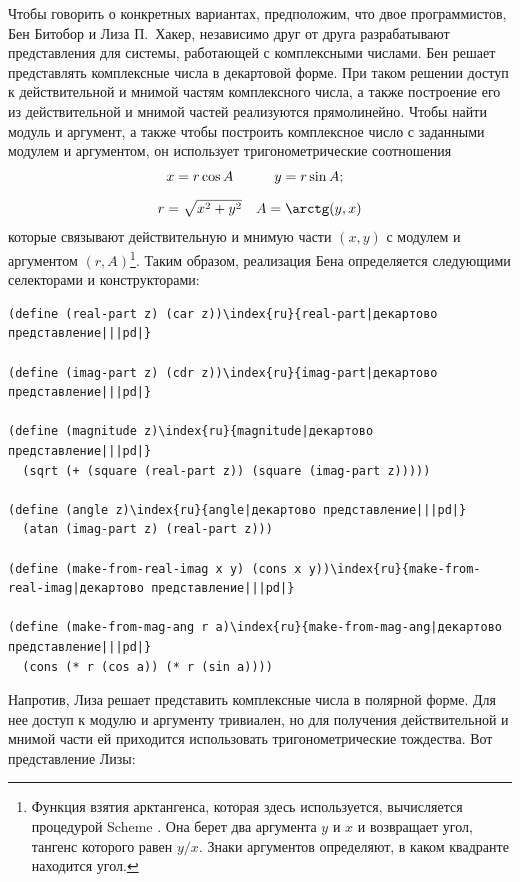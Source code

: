 Чтобы говорить о конкретных вариантах, предположим, что
двое программистов, Бен Битобор и Лиза П.~Хакер, независимо
друг от друга разрабатывают представления для системы, работающей с
комплексными числами.  Бен решает представлять комплексные числа в
декартовой форме.  При
таком решении доступ к действительной и мнимой 
частям комплексного числа, а также построение его из действительной и
мнимой частей  реализуются прямолинейно.  Чтобы найти модуль и
аргумент, а также чтобы построить комплексное число с заданными модулем 
и аргументом, он использует тригонометрические соотношения
$$
\begin{array}{cc}
x = r \cos A & y = r \sin A; \\[10pt]
r = \sqrt{x^2 + y^2}& A = \arctg (y, x)
\end{array}
$$
которые связывают действительную и мнимую части $(x, y)$ с
модулем и аргументом $(r, A)$\footnote{Функция взятия  
арктангенса, которая здесь 
используется, вычисляется процедурой Scheme .
Она берет два аргумента $y$ и $x$ и возвращает угол, 
тангенс которого равен $y/x$.   Знаки аргументов
определяют, в каком квадранте находится угол.}.
Таким образом, реализация Бена определяется следующими селекторами и
конструкторами: 

\begin{Verbatim}[fontsize=\small]
(define (real-part z) (car z))\index{ru}{real-part|декартово представление|||pd|}

(define (imag-part z) (cdr z))\index{ru}{imag-part|декартово представление|||pd|}

(define (magnitude z)\index{ru}{magnitude|декартово представление|||pd|}
  (sqrt (+ (square (real-part z)) (square (imag-part z)))))

(define (angle z)\index{ru}{angle|декартово представление|||pd|}
  (atan (imag-part z) (real-part z)))

(define (make-from-real-imag x y) (cons x y))\index{ru}{make-from-real-imag|декартово представление|||pd|}

(define (make-from-mag-ang r a)\index{ru}{make-from-mag-ang|декартово представление|||pd|}
  (cons (* r (cos a)) (* r (sin a))))
\end{Verbatim}

Напротив, Лиза решает представить комплексные числа
в полярной форме.  Для нее доступ к модулю и аргументу тривиален, но для
получения действительной и мнимой части ей приходится использовать
тригонометрические тождества.  Вот представление Лизы: 

